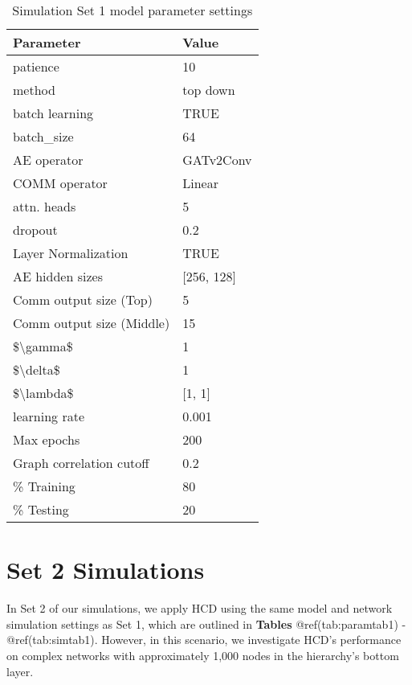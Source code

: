 \documentclass[
]{article}
\begin{document}
\begin{table}
\centering
\caption{\label{tab:paramtab1}Simulation Set 1 model parameter settings}
\centering
\begin{tabular}[t]{l|l}
\hline
Parameter & Value\\
\hline
patience & 10\\
\hline
method & top down\\
\hline
batch learning & TRUE\\
\hline
batch\_size & 64\\
\hline
AE operator & GATv2Conv\\
\hline
COMM operator & Linear\\
\hline
attn. heads & 5\\
\hline
dropout & 0.2\\
\hline
Layer Normalization & TRUE\\
\hline
AE hidden sizes & [256, 128]\\
\hline
Comm output size (Top) & 5\\
\hline
Comm output size (Middle) & 15\\
\hline
\$\textbackslash{}gamma\$ & 1\\
\hline
\$\textbackslash{}delta\$ & 1\\
\hline
\$\textbackslash{}lambda\$ & [1, 1]\\
\hline
learning rate & 0.001\\
\hline
Max epochs & 200\\
\hline
Graph correlation cutoff & 0.2\\
\hline
\% Training & 80\\
\hline
\% Testing & 20\\
\hline
\end{tabular}
\end{table}

\section{Set 2 Simulations}\label{set-2-simulations}

In Set 2 of our simulations, we apply HCD using the same model and
network simulation settings as Set 1, which are outlined in
\textbf{Tables} @ref(tab:paramtab1) - @ref(tab:simtab1). However, in
this scenario, we investigate HCD's performance on complex networks with
approximately 1,000 nodes in the hierarchy's bottom layer.
\end{document}
